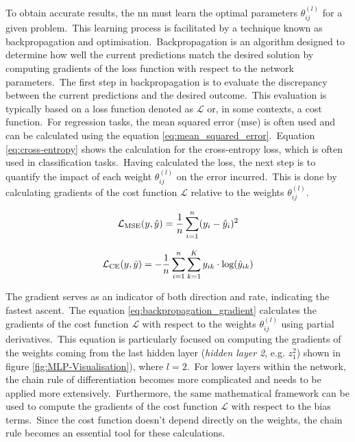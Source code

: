 \noindent
To obtain accurate results, the \gls{nn} must learn the optimal parameters $\theta_{ij}^{(l)}$ for a given problem.\
This learning process is facilitated by a technique known as backpropagation and optimisation.\
Backpropagation is an algorithm designed to determine how well the current predictions match the desired solution by computing gradients of the loss function with respect to the network parameters.\
The first step in backpropagation is to evaluate the discrepancy between the current predictions and the desired outcome.\
This evaluation is typically based on a loss function denoted as $\mathcal{L}$ or, in some contexts, a cost function.\
For regression tasks, the mean squared error (\gls{mse}) is often used and can be calculated using the equation \ref{eq:mean_squared_error}.\
Equation \ref{eq:cross-entropy} shows the calculation for the cross-entropy loss, which is often used in classification tasks.\
Having calculated the loss, the next step is to quantify the impact of each weight $\theta_{ij}^{(l)}$ on the error incurred.\
This is done by calculating gradients of the cost function $\mathcal{L}$ relative to the weights $\theta_{ij}^{(l)}$.\

\myequations{Mean Squared Error}
\begin{equation}
    \centering
    \mathcal{L}_{\text{MSE}}(y, \hat{y}) = \frac{1}{n} \sum^n_{i=1}(y_i - \hat{y}_i)^2
    \label{eq:mean_squared_error}
\end{equation}

\begin{equation}
    \centering
    \mathcal{L}_{\text{CE}}(y, \hat{y}) = - \frac{1}{n} \sum^n_{i=1}\sum^K_{k=1}y_{ik} \cdot \text{log}(\hat{y}_{ik})
    \label{eq:cross-entropy}
\end{equation}

\noindent
The gradient serves as an indicator of both direction and rate, indicating the fastest ascent.\
The equation \ref{eq:backpropagation_gradient} calculates the gradients of the cost function $\mathcal{L}$ with respect to the weights $\theta_{ij}^{(l)}$ using partial derivatives.\
This equation is particularly focused on computing the gradients of the weights coming from the last hidden layer (\textit{hidden layer 2}, e.g. $z_1^2$) shown in figure \ref{fig:MLP-Visualisation}), where $l = 2$.\
For lower layers within the network, the chain rule of differentiation becomes more complicated and needs to be applied more extensively.\
Furthermore, the same mathematical framework can be used to compute the gradients of the cost function $\mathcal{L}$ with respect to the bias terms.\
Since the cost function doesn't depend directly on the weights, the chain rule becomes an essential tool for these calculations.

